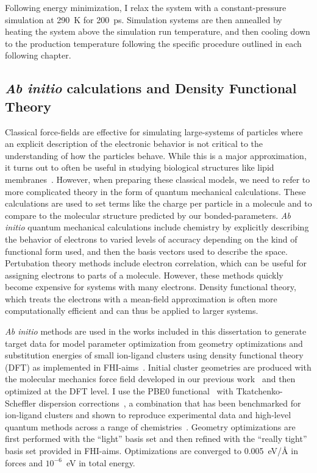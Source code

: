 Following energy minimization, I relax the system with a constant-pressure
simulation at 290~K for 200~ps. Simulation systems are then annealled by heating the system above the
simulation run temperature, and then cooling down to the production temperature following the
specific procedure outlined in each following chapter.

\subsection{\emph{Ab initio} calculations and Density Functional Theory}
Classical force-fields are effective for simulating large-systems of particles where an explicit description of 
the electronic behavior is not critical to the understanding of how the particles behave. While this is a major 
approximation, it turns out to often be useful in studying biological structures like lipid membranes~\cite{berkowitz:2019}.
However, when preparing these classical models, we need to refer to more complicated theory in the form 
of quantum mechanical calculations. These calculations are used to set terms like the 
charge per particle in a molecule and to compare to the molecular structure predicted by our bonded-parameters.
\emph{Ab initio} quantum mechanical calculations include chemistry by explicitly describing the behavior of electrons to varied 
levels of accuracy depending on the kind of functional form used, and then the basis vectors used to describe the space.
Pertubation theory methods include electron correlation, which can be useful for assigning electrons to parts of a molecule. 
However, these methods quickly become expensive for systems with many electrons. Density functional theory, which treats the electrons 
with a mean-field approximation is often more computationally efficient and can thus be applied to larger systems.

\emph{Ab initio} methods are used in the works included in this dissertation to generate target data for 
model parameter optimization from geometry
optimizations and substitution energies of small ion-ligand clusters
using density functional theory (DFT) as implemented in
FHI-aims~\cite{fhiaims}. Initial cluster geometries are produced with
the molecular mechanics force field developed in our previous
work~\cite{kruczek:2017,saunders:2019} and then optimized at the DFT
level. I use the PBE0 functional~\cite{perdew:1996:generalized,adamo:1999:toward}
with Tkatchenko-Scheffler dispersion corrections~\cite{tkatchenko:2009},
a combination that has been benchmarked for ion-ligand clusters and shown
to reproduce experimental data and high-level quantum methods across a
range of chemistries~\cite{wineman:2019,wineman:2020:transferable,wineman:2020:improved}.
Geometry optimizations are first performed with the ``light'' basis set
and then refined with the ``really tight'' basis set provided in
FHI-aims. Optimizations are converged to 0.005~eV/\AA{} in forces and
$10^{-6}$~eV in total energy.  

